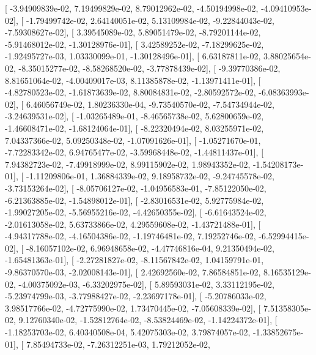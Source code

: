 \documentclass{article}
\begin{document}
       [ -3.94909839e-02,   7.19499829e-02,   8.79012962e-02,
         -4.50194998e-02,  -4.09410953e-02],
       [ -1.79499742e-02,   2.64140051e-02,   5.13109984e-02,
         -9.22844043e-02,  -7.59308627e-02],
       [  3.39545089e-02,   5.89051479e-02,  -8.79201144e-02,
         -5.91468012e-02,  -1.30128976e-01],
       [  3.42589252e-02,  -7.18299625e-02,  -1.92495727e-03,
          1.03330099e-01,  -1.30128496e-01],
       [  6.63187811e-02,   3.88025654e-02,  -8.35015277e-02,
         -8.58268520e-02,  -3.77878439e-02],
       [ -9.39770386e-02,   8.81651064e-02,  -4.00409017e-03,
          8.11385878e-02,  -1.13971411e-01],
       [ -4.82780523e-02,  -1.61873639e-02,   8.80084831e-02,
         -2.80592572e-02,  -6.08363993e-02],
       [  6.46056749e-02,   1.80236330e-04,  -9.73540570e-02,
         -7.54734944e-02,  -3.24639531e-02],
       [ -1.03265489e-01,  -8.46565738e-02,   5.62800659e-02,
         -1.46608471e-02,  -1.68124064e-01],
       [ -8.22320494e-02,   8.03255971e-02,   7.04337366e-02,
          5.09250348e-02,  -1.07091626e-01],
       [ -1.05271670e-01,  -7.72283342e-02,   6.94765477e-02,
         -3.59968448e-02,  -1.44811437e-01],
       [  7.94382723e-02,  -7.49918999e-02,   8.99115902e-02,
          1.98943352e-02,  -1.54208173e-01],
       [ -1.11209806e-01,   1.36884339e-02,   9.18958732e-02,
         -9.24745578e-02,  -3.73153264e-02],
       [ -8.05706127e-02,  -1.04956583e-01,  -7.85122050e-02,
         -6.21363885e-02,  -1.54898012e-01],
       [ -2.83016531e-02,   5.92775984e-02,  -1.99027205e-02,
         -5.56955216e-02,  -4.42650355e-02],
       [ -6.61643524e-02,  -2.01613058e-02,   5.63733866e-02,
          4.29559608e-02,  -1.43721488e-01],
       [ -4.94317788e-02,  -4.16504386e-02,  -1.19746481e-02,
          7.19252746e-02,  -6.52994415e-02],
       [ -8.16057102e-02,   6.96948658e-02,  -4.47746816e-04,
          9.21350494e-02,  -1.65481363e-01],
       [ -2.27281827e-02,  -8.11567842e-02,   1.04159791e-01,
         -9.86370570e-03,  -2.02008143e-01],
       [  2.42692560e-02,   7.86584851e-02,   8.16535129e-02,
         -4.00375092e-03,  -6.33202975e-02],
       [  5.89593031e-02,   3.33112195e-02,  -5.23974799e-03,
         -3.77988427e-02,  -2.23697178e-01],
       [ -5.20786033e-02,   3.98517766e-02,  -4.72775990e-02,
          1.73470445e-02,  -7.05608339e-02],
       [  7.51358305e-02,   9.12760340e-02,  -1.52812764e-02,
         -8.53824469e-02,  -1.14224372e-01],
       [ -1.18253703e-02,   6.40340508e-04,   5.42075303e-02,
          3.79874057e-02,  -1.33852675e-01],
       [  7.85494733e-02,  -7.26312251e-03,   1.79212052e-02,
\end{document}
